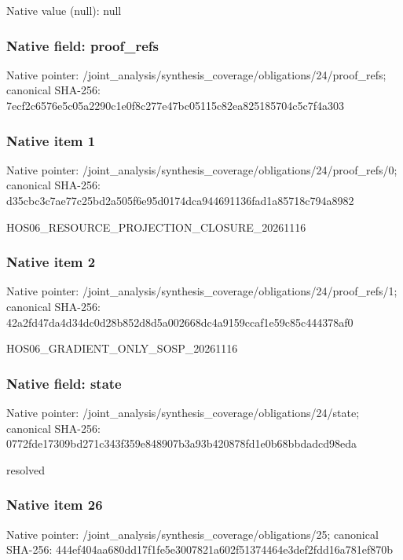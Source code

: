 \documentclass[10pt,a4paper]{article}
\begin{document}
Native value (null): null

\subsubsection{Native field: proof\_\allowbreak{}refs}
Native pointer: /joint\_\allowbreak{}analysis/synthesis\_\allowbreak{}coverage/obligations/24/proof\_\allowbreak{}refs; canonical SHA-256: 7ecf2c6576e5c05a2290c1e0f8c277e47bc05115c82ea825185704c5c7f4a303

\subsubsection{Native item 1}
Native pointer: /joint\_\allowbreak{}analysis/synthesis\_\allowbreak{}coverage/obligations/24/proof\_\allowbreak{}refs/0; canonical SHA-256: d35cbc3c7ae77c25bd2a505f6e95d0174dca944691136fad1a85718c794a8982

\begingroup\raggedright\sloppy HOS06\_\allowbreak{}RESOURCE\_\allowbreak{}PROJECTION\_\allowbreak{}CLOSURE\_\allowbreak{}20261116\par\endgroup

\subsubsection{Native item 2}
Native pointer: /joint\_\allowbreak{}analysis/synthesis\_\allowbreak{}coverage/obligations/24/proof\_\allowbreak{}refs/1; canonical SHA-256: 42a2fd47da4d34dc0d28b852d8d5a002668dc4a9159ccaf1e59c85c444378af0

\begingroup\raggedright\sloppy HOS06\_\allowbreak{}GRADIENT\_\allowbreak{}ONLY\_\allowbreak{}SOSP\_\allowbreak{}20261116\par\endgroup

\subsubsection{Native field: state}
Native pointer: /joint\_\allowbreak{}analysis/synthesis\_\allowbreak{}coverage/obligations/24/state; canonical SHA-256: 0772fde17309bd271c343f359e848907b3a93b420878fd1e0b68bbdadcd98eda

\begingroup\raggedright\sloppy resolved\par\endgroup

\subsubsection{Native item 26}
Native pointer: /joint\_\allowbreak{}analysis/synthesis\_\allowbreak{}coverage/obligations/25; canonical SHA-256: 444ef404aa680dd17f1fe5e3007821a602f51374464e3def2fdd16a781ef870b
\end{document}
